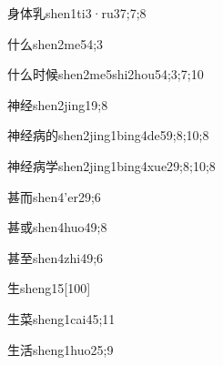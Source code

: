 \begin{verbete}{身体乳}{shen1ti3·ru3}{7;7;8}
\end{verbete}

\begin{verbete}{什么}{shen2me5}{4;3}
\end{verbete}

\begin{verbete}{什么时候}{shen2me5shi2hou5}{4;3;7;10}
\end{verbete}

\begin{verbete}{神经}{shen2jing1}{9;8}
\end{verbete}

\begin{verbete}{神经病的}{shen2jing1bing4de5}{9;8;10;8}
\end{verbete}

\begin{verbete}{神经病学}{shen2jing1bing4xue2}{9;8;10;8}
\end{verbete}

\begin{verbete}{甚而}{shen4'er2}{9;6}
\end{verbete}

\begin{verbete}{甚或}{shen4huo4}{9;8}
\end{verbete}

\begin{verbete}{甚至}{shen4zhi4}{9;6}
\end{verbete}

\begin{verbete}{生}{sheng1}{5}[100]
\end{verbete}

\begin{verbete}{生菜}{sheng1cai4}{5;11}
\end{verbete}

\begin{verbete}{生活}{sheng1huo2}{5;9}
\end{verbete}

